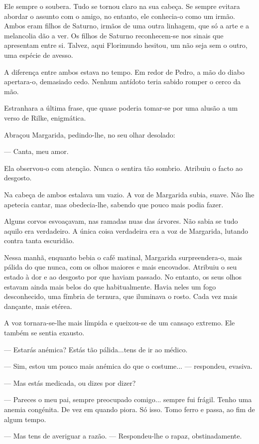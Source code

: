 Ele sempre o soubera. Tudo se tornou claro na sua cabeça. Se sempre
evitara abordar o assunto com o amigo, no entanto, ele conhecia-o como
um irmão. Ambos eram filhos de Saturno, irmãos de uma outra linhagem,
que só a arte e a melancolia dão a ver. Os filhos de Saturno
reconhecem-se nos sinais que apresentam entre si. Talvez, aqui
Florimundo hesitou, um não seja sem o outro, uma espécie de avesso.

A diferença entre ambos estava no tempo. Em redor de Pedro, a mão do
diabo apertara-o, demasiado cedo. Nenhum antídoto teria sabido romper o
cerco da mão.

Estranhara a última frase, que quase poderia tomar-se por uma alusão a
um verso de Rilke, enigmática.

Abraçou Margarida, pedindo-lhe, no seu olhar desolado:

--- Canta, meu amor.

Ela observou-o com atenção. Nunca o sentira tão sombrio. Atribuiu o
facto ao desgosto.

Na cabeça de ambos estalava um vazio. A voz de Margarida subia, suave.
Não lhe apetecia cantar, mas obedecia-lhe, sabendo que pouco mais podia
fazer.

Alguns corvos esvoaçavam, nas ramadas nuas das árvores. Não sabia se
tudo aquilo era verdadeiro. A única coisa verdadeira era a voz de
Margarida, lutando contra tanta escuridão.

Nessa manhã, enquanto bebia o café matinal, Margarida surpreendera-o,
mais pálida do que nunca, com os olhos maiores e mais encovados.
Atribuiu o seu estado à dor e ao desgosto por que haviam passado. No
entanto, os seus olhos estavam ainda mais belos do que habitualmente.
Havia neles um fogo desconhecido, uma fímbria de ternura, que iluminava
o rosto. Cada vez mais dançante, mais etérea.

A voz tornara-se-lhe mais límpida e queixou-se de um cansaço extremo.
Ele também se sentia exausto.

--- Estarás anémica? Estás tão pálida...tens de ir ao médico.

--- Sim, estou um pouco mais anémica do que o costume... --- respondeu,
evasiva.

--- Mas estás medicada, ou dizes por dizer?

--- Pareces o meu pai, sempre preocupado comigo... sempre fui frágil.
Tenho uma anemia congénita. De vez em quando piora. Só isso. Tomo ferro
e passa, ao fim de algum tempo.

--- Mas tens de averiguar a razão. ---  Respondeu-lhe o rapaz,
obstinadamente.

